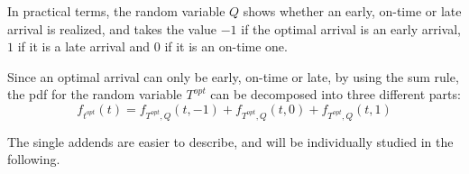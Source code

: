 In practical terms, the random variable \(Q\) shows whether an early, on-time or late arrival is realized,
and takes the value \(-1\) if the optimal arrival is an early arrival,
\(1\) if it is a late arrival and \(0\) if it is an on-time one.

Since an optimal arrival can only be early, on-time or late,
by using the sum rule, the pdf for the random variable \(T^{opt}\) can be decomposed into three different parts:
\begin{equation}
  \label{eq:pdf-decomposed-q}
  f_{t^{opt}}(t) = f_{T^{opt}, Q}(t, -1) + f_{T^{opt}, Q}(t, 0) + f_{T^{opt}, Q}(t, 1)
\end{equation}

The single addends are easier to describe,
and will be individually studied in the following.
